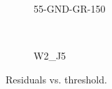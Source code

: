 \begin{figure}[htbp]
\begin{subfigure}[b]{0.33\textwidth}
    \caption{55-GND-GR-150}
  \end{subfigure}\\
  \begin{subfigure}[b]{0.33\textwidth}

    \caption{W2\_J5}
  \end{subfigure}
  \caption{Residuals vs. threshold.}
  \label{fig:Residuals_vs_Threshold}
\end{figure}

\newpage




